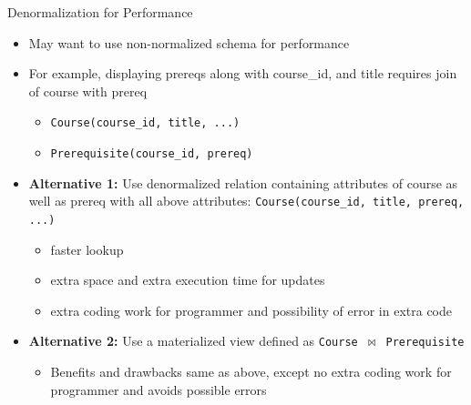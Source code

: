 \documentclass[aspectratio=169, xcolor=dvipsnames]{beamer}
\begin{document}
\begin{frame}{Denormalization for Performance}
    \begin{itemize}[<+->]
        \item May want to use non-normalized schema for performance
        \item For example, displaying prereqs along with course\_id, and title requires join of course with prereq
        \begin{itemize}
            \item[$\triangleright$] \texttt{Course(course\_id, title, ...)}
            \item[$\triangleright$] \texttt{Prerequisite(course\_id, prereq)}
        \end{itemize}
        \item \textbf{Alternative 1:} Use denormalized relation containing attributes of course as well as prereq with all above attributes: \texttt{Course(course\_id, title, prereq, ...)}
        \begin{itemize}
            \item[$\triangleright$] faster lookup
            \item[$\triangleright$] extra space and extra execution time for updates
            \item[$\triangleright$] extra coding work for programmer and possibility of error in extra code
        \end{itemize}
        \item \textbf{Alternative 2:} Use a materialized view defined as \texttt{Course $\bowtie$ Prerequisite}
        \begin{itemize}
            \item[$\triangleright$] Benefits and drawbacks same as above, except no extra coding work for programmer and avoids possible errors
        \end{itemize}
    \end{itemize}
\end{frame}
\end{document}
